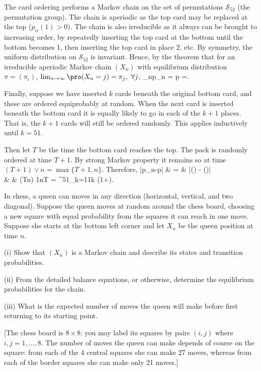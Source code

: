 The card ordering performs a Markov chain on the set of permutations $\mathcal{S}_{52}$ (the permutation group). The chain is aperiodic as the top card may be replaced at the top ($p_{ii}{(1)}>0$). The chain is also irreducible as it always can be brought to increasing order, by repeatedly inserting the top card at the bottom until the bottom becomes 1, then inserting the top card in place 2, etc. By symmetry, the uniform distribution on $\mathcal{S}_{52}$ is invariant. Hence, by the theorem that for an irreducible aperiodic Markov chain $(X_n)$ with equilibrium distribution $\pi=(\pi_i)$, $\lim_{n\to\infty}\pro(X_n=j)=\pi_j, \ \forall j$,
\be
\lim_{n\to\infty}p_n = p =.
\ee

Finally, suppose we have inserted $k$ cards beneath the original bottom card, and these are ordered equiprobably at random. When the next card is inserted beneath the bottom card it is equally likely to go in each of the $k+1$ places. That is, the $k+1$ cards will still be ordered randomly. This applies inductively until $k=51$.

Then let $T$ be the time the bottom card reaches the top. The pack is randomly ordered at time $T+1$. By strong Markov property it remains so at time $(T+1)\lor n = \max\{T+1,n\}$. Therefore,
\bea
|p_n-p| & = & |\pro() - \pro()|\nonumber\\
& \leq & \pro(T\geq n) \leq \frac 1n\E T = \sum^{51}_{k=1}\frac 1k \leq {}(1+).
\eea

\begin{exercise}
In chess, a queen can moves in any direction (horizontal, vertical, and two diagonal). Suppose the queen moves at random around the chess board, choosing a new square with equal probability from the squares it can reach in one move. Suppose she starts at the bottom left corner and let $X_n$ be the queen position at time $n$.

(i) Show that $(X_n)$ is a Markov chain and describe its states and transition probabilities.

(ii) From the detailed balance equations, or otherwise, determine the equilibrium probabilities for the chain.

(iii) What is the expected number of moves the queen will make before first returning to its starting point.

[The chess board is $8\times 8$: you may label its squares by pairs $(i,j)$ where $i,j=1,\dots,8$. The number of moves the queen can make depends of course on the square: from each of the 4 central squares she can make 27 moves, whereas from each of the border squares she can make only 21 moves.]
\end{exercise}

